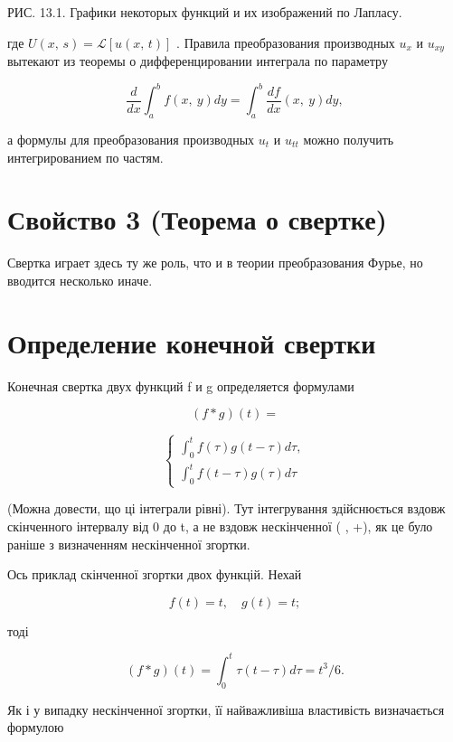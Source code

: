 \documentclass[
  ukrainian,
]{article}
\begin{document}
РИС. 13.1. Графики некоторых функций и их изображений по Лапласу.

где \(U\left(x,\,s\right)=\mathcal{L}\left[u\left(x,\,t\right)\right]\)
. Правила преобразования производных \(u_{x}\) и \(u_{xy}\) вытекают из
теоремы о дифференцировании интеграла по параметру

\[
\frac{d}{dx}\int_{a}^{b}f\left(x,\ y\right)dy=\int_{a}^{b}\frac{df}{dx}\left(x,\ y\right)dy,
\]

а формулы для преобразования производных \(u_t\) и \(u_{tt}\) можно
получить интегрированием по частям.

\section{Свойство 3 (Теорема о
свертке)}\label{ux441ux432ux43eux439ux441ux442ux432ux43e-3-ux442ux435ux43eux440ux435ux43cux430-ux43e-ux441ux432ux435ux440ux442ux43aux435}

Свертка играет здесь ту же роль, что и в теории преобразования Фурье, но
вводится несколько иначе.

\section{Определение конечной
свертки}\label{ux43eux43fux440ux435ux434ux435ux43bux435ux43dux438ux435-ux43aux43eux43dux435ux447ux43dux43eux439-ux441ux432ux435ux440ux442ux43aux438}

Конечная свертка двух функций f и g определяется формулами

\[
(f * g) (t) =
\]

\[
\begin{cases} \int_0^t f(\tau) g(t-\tau) d\tau, \\ \int_0^t f(t-\tau) g(\tau) d\tau \end{cases}
\]

(Можна довести, що ці інтеграли рівні). Тут інтегрування здійснюється
вздовж скінченного інтервалу від 0 до t, а не вздовж нескінченної (
\infty , +\infty ), як це було раніше з визначенням нескінченної
згортки.

Ось приклад скінченної згортки двох функцій. Нехай

\[
f(t) = t, \quad g(t) = t;
\]

тоді

\[
(f * g)(t) = \int_{0}^{t} \tau(t - \tau) d\tau = t^{3}/6.
\]

Як і у випадку нескінченної згортки, її найважливіша властивість
визначається формулою
\end{document}
